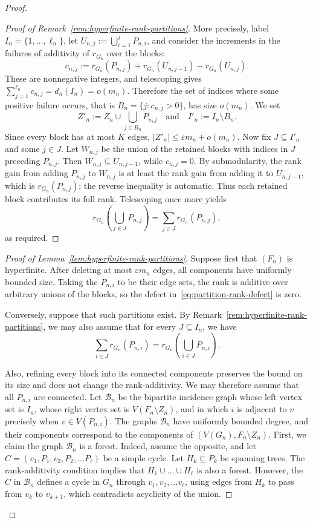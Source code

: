 \documentclass{article}
\theoremstyle{plain}
\theoremstyle{definition}
\newcommand{\cB}{\mathcal{B}}
\newcommand{\eps}{\varepsilon}
\begin{document}
\begin{proof}
\begin{proof}[Proof of Remark~\ref{rem:hyperfinite-rank-partitions}]
More precisely, label $I_n=\{1,\ldots,\ell_n\}$, let $U_{n,j}:=\bigcup_{i=1}^{j}P_{n,i}$, and consider the increments in the failures of additivity of $r_{G_n}$ over the blocks:
    \[
        c_{n,j}:=r_{G_n}(P_{n,j})+r_{G_n}(U_{n,j-1})-r_{G_n}(U_{n,j}).
    \]
These are nonnegative integers, and telescoping gives $ \sum_{j=1}^{\ell_n}c_{n,j}=d_n(I_n)=o(m_n)$. Therefore the set of indices where some positive failure occurs, that is $B_n=\{j:c_{n,j}>0\}$, has size $o(m_n)$. We set
    \[
        Z'_n:=Z_n\cup\bigcup_{j\in B_n}P_{n,j}
        \quad\text{and}\quad I'_n:=I_n\setminus B_n.
    \]
Since every block has at most $K$ edges, $|Z'_n|\leq \eps m_n+o(m_n)$. Now fix $J \subseteq I'_n$ and some $j\in J$. Let $W_{n,j}$ be the union of the retained blocks with indices in $J$ preceding $P_{n,j}$. Then $W_{n,j}\subseteq U_{n,j-1}$, while $c_{n,j}=0$. By submodularity, the rank gain from adding $P_{n,j}$ to $W_{n,j}$ is at least the rank gain from
    adding it to $U_{n,j-1}$, which is $r_{G_n}(P_{n,j})$; the reverse
    inequality is automatic. Thus each retained block contributes its full
    rank. Telescoping once more yields
    \[
        r_{G_n}\left(\bigcup_{j\in J}P_{n,j}\right)
        =\sum_{j\in J}r_{G_n}(P_{n,j}),
    \]
    as required.
\end{proof}

\begin{proof}[Proof of Lemma~\ref{lem:hyperfinite-rank-partitions}]
Suppose first that $(F_n)$ is hyperfinite. After deleting at most $\eps m_n$ edges, all components have uniformly bounded size. Taking the $P_{n,i}$ to be their edge sets, the rank is additive over arbitrary unions of the blocks, so the defect in~\eqref{eq:partition-rank-defect} is zero.

Conversely, suppose that such partitions exist. By Remark~\ref{rem:hyperfinite-rank-partitions}, we may also assume that for every $J\subseteq I_n$, we have   \[ \sum_{i\in J}r_{G_n}(P_{n,i})
    =r_{G_n}\left(\bigcup_{i\in J}P_{n,i}\right).\]


Also, refining every block into its connected components preserves the bound on its size and does not change the rank-additivity. We may therefore assume that all $P_{n,i}$ are connected. Let $\cB_n$ be the bipartite incidence graph whose left vertex set is $I_n$, whose right vertex set is $V(F_n\setminus Z_n)$, and in which $i$ is adjacent to $v$ precisely when $v\in V(P_{n,i})$. The graphs $\cB_n$ have uniformly bounded degree, and their components correspond to the components of $(V(G_n),F_n\setminus Z_n)$. First, we claim the graph $\cB_n$ is a forest. Indeed, assume the opposite, and let $C=(v_1,P_1,v_2,P_2,\dots P_\ell)$ be  a simple cycle. Let $H_k\subseteq P_k$ be spanning trees. The rank-additivity condition implies that $H_1\cup\dots\cup H_\ell$ is also a forest. However, the $C$ in $\cB_n$ defines a cycle in $G_n$ through $v_1,v_2,\dots v_\ell$, using edges from $H_k$ to pass from $v_{k}$ to $v_{k+1}$, which contradicts acyclicity of the union.


\end{proof}
\end{proof}
\end{document}
